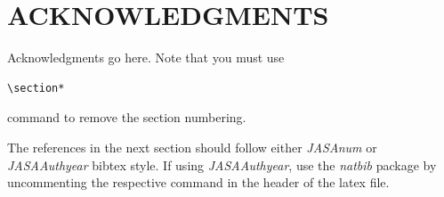 \documentclass[a4paper,10pt]{ica2013_2}
\begin{document}
\section*{ACKNOWLEDGMENTS}
Acknowledgments go here. Note that you must use \begin{verbatim}\section*\end{verbatim} command to remove the section numbering.

The references in the next section should follow either \textit{JASAnum} or \textit{JASAAuthyear} bibtex style. If using \textit{JASAAuthyear}, use the \textit{natbib} package by uncommenting the respective command in the header of the  latex file.

%


\end{document}
